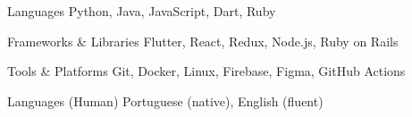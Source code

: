 
\begin{cvskills}

  \cvskill
    {Languages} %
    {Python, Java, JavaScript, Dart, Ruby}  

  \cvskill
    {Frameworks \& Libraries} %
    {Flutter, React, Redux, Node.js, Ruby on Rails}

  \cvskill
    {Tools \& Platforms} %
    {Git, Docker, Linux, Firebase, Figma, GitHub Actions}

  \cvskill
    {Languages (Human)} %
    {Portuguese (native), English (fluent)}

\end{cvskills}
